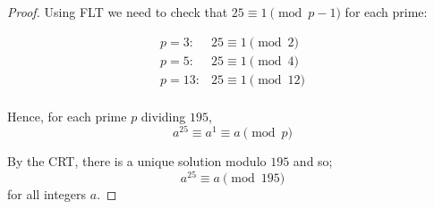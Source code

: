 \documentclass{tufte-handout}
\begin{document}
\begin{question}
\begin{proof}
Using FLT we need to check that \( 25 \equiv 1 \pmod{p-1} \) for each prime:

\begin{align*}
    p=3: & 25 \equiv 1 \pmod{2}\\[8pt]
    p=5: & 25 \equiv 1 \pmod{4}\\[8pt]
    p=13: & 25 \equiv 1 \pmod{12}\\[8pt]
\end{align*}

Hence, for each prime \( p \) dividing \( 195 \),
\[ a^{25} \equiv a^1 \equiv a \pmod{p} \]

By the CRT, there is a unique solution modulo \( 195 \) and so;
\[ a^{25} \equiv a \pmod{195} \]    
for all integers \( a \).

\end{proof}

\end{question}
\end{document}
